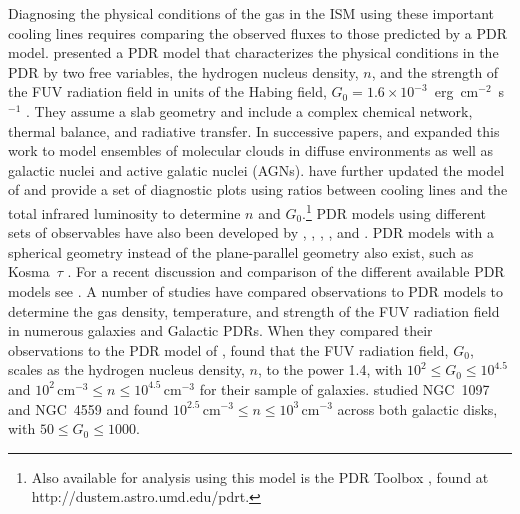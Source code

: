 Diagnosing the physical conditions of the gas in the ISM using these important cooling lines requires comparing the observed fluxes to those predicted by a PDR model.  \citet{1985ApJ...291..722T} presented a PDR model that characterizes the physical conditions in the PDR by two free variables, the hydrogen nucleus density, $n$, and the strength of the FUV radiation field in units of the Habing field, $G_0 = 1.6 \times 10^{-3}$~erg~cm$^{-2}$~s$^{-1}$ \citep{1968BAN....19..421H}.  They assume a slab geometry and include a complex chemical network, thermal balance, and radiative transfer.  In successive papers, \citet{1990ApJ...358..116W} and \cite{1991ApJ...377..192H} expanded this work to model ensembles of molecular clouds in diffuse environments as well as galactic nuclei and active galatic nuclei (AGNs).  \citet{1999ApJ...527..795K,2006ApJ...644..283K} have further updated the model of \citet{1990ApJ...358..116W} and provide a set of diagnostic plots using ratios between cooling lines and the total infrared luminosity to determine $n$ and $G_0$.\footnote{Also available for analysis using this model is the PDR Toolbox \citep{2008ASPC..394..654P}, found at http://dustem.astro.umd.edu/pdrt.}  PDR models using different sets of observables have also been developed by \citet{1986ApJS...62..109V,1988ApJ...334..771V}, \citet{1989ApJ...338..197S, 1995ApJS...99..565S}, \citet{1997ApJ...482..298L}, \citet{2000A&A...358..682S}, and \citet{2006ApJS..164..506L}.  PDR models with a spherical geometry instead of the plane-parallel geometry also exist, such as Kosma~$\tau$ \citep[e.g., ][]{2006A&A...451..917R}.  For a recent discussion and comparison of the different available PDR models see \citet{2007A&A...467..187R}. A number of studies have compared observations to PDR models to determine the gas density, temperature, and strength of the FUV radiation field in numerous galaxies and Galactic PDRs.  When they compared their observations to the PDR model of \citet{1999ApJ...527..795K}, \citet{2001ApJ...561..766M} found that the FUV radiation field, $G_{0}$, scales as the hydrogen nucleus density, $n$, to the power 1.4, with $10^{2} \le G_{0} \le 10^{4.5}$ and $10^{2}\,\mathrm{cm}^{-3} \le n \le 10^{4.5}\,\mathrm{cm}^{-3}$ for their sample of galaxies.  \citet{2012ApJ...747...81C} studied NGC~1097 and NGC~4559 and found $10^{2.5}\,\mathrm{cm}^{-3} \le n \le 10^{3}\,\mathrm{cm}^{-3}$ across both galactic disks, with $50 \le G_{0} \le 1000$.


